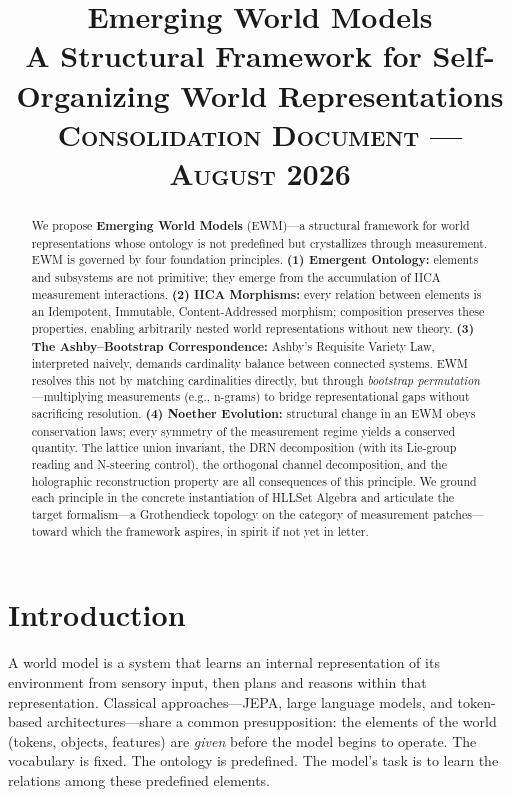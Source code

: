 \documentclass[11pt,a4paper]{article}
\title{\textbf{Emerging World Models}\\[4pt]
\large A Structural Framework for Self-Organizing World Representations
\\[4pt]
\large \textsc{Consolidation Document --- August 2026}}
\date{}
\theoremstyle{remark}
\begin{document}
\maketitle

\begin{abstract}
We propose \textbf{Emerging World Models} (EWM)---a structural framework for world
representations whose ontology is not predefined but crystallizes through measurement.
EWM is governed by four foundation principles. \textbf{(1) Emergent Ontology:} elements
and subsystems are not primitive; they emerge from the accumulation of IICA measurement
interactions. \textbf{(2) IICA Morphisms:} every relation between elements is an
Idempotent, Immutable, Content-Addressed morphism; composition preserves these
properties, enabling arbitrarily nested world representations without new theory.
\textbf{(3) The Ashby--Bootstrap Correspondence:} Ashby's Requisite Variety Law,
interpreted naively, demands cardinality balance between connected systems. EWM resolves
this not by matching cardinalities directly, but through \textit{bootstrap
permutation}---multiplying measurements (e.g., n-grams) to bridge representational gaps
without sacrificing resolution. \textbf{(4) Noether Evolution:} structural change in an
EWM obeys conservation laws; every symmetry of the measurement regime yields a conserved
quantity. The lattice union invariant, the DRN decomposition (with its Lie-group
reading and N-steering control), the orthogonal channel decomposition, and the
holographic reconstruction property are all consequences of this principle. We
ground each principle
in the concrete instantiation of HLLSet Algebra and articulate the target formalism---a
Grothendieck topology on the category of measurement patches---toward which the framework
aspires, in spirit if not yet in letter.
\end{abstract}

\section{Introduction}

A world model is a system that learns an internal representation of its environment
from sensory input, then plans and reasons within that representation. Classical
approaches---JEPA, large language models, and token-based architectures---share a common
presupposition: the elements of the world (tokens, objects, features) are \textit{given}
before the model begins to operate. The vocabulary is fixed. The ontology is predefined.
The model's task is to learn the relations among these predefined elements.
\end{document}

